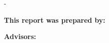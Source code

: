 \begin{titlingpage}

	\cleardoublepage
	\thispagestyle{empty}
	\calccentering{\unitlength}
	\begin{adjustwidth*}{\unitlength}{-\unitlength}
		\textbf{\ThTitleEN}

		\noindent\textbf{This report was prepared by:}\\
		\ThAuthors


		\noindent\textbf{Advisors:}\\
		\ThSupervisors


		\noindent\ThDepartment




\end{adjustwidth*}
\end{titlingpage}
